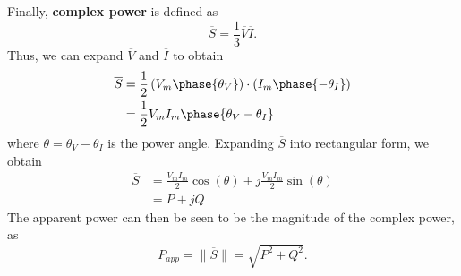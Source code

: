 \documentclass[11pt]{article}
\theoremstyle{plain} %
\theoremstyle{definition}
\theoremstyle{example}
\theoremstyle{remark}
\begin{document}
Finally, \textbf{complex power} is defined as 
$$\overline S = \frac{1}{3}\overline V\overline I.$$
Thus, we can expand $\overline V$ and $\overline I$ to obtain 
\begin{align*}
	\overline S &= \frac{1}{2}\left(V_m\phase{\theta_V}\right)\cdot \left(I_m\phase{-\theta_I}\right)\\
	&= \frac{1}{2}V_mI_m\phase{\theta_V-\theta_I}
\end{align*}
where $\theta = \theta_V-\theta_I$ is the power angle. Expanding $\overline S$ into rectangular form, we obtain 
\begin{align*}
	\overline S &= \frac{V_mI_m}{2}\cos(\theta) + j\frac{V_mI_m}{2}\sin(\theta)\\
	&= P + jQ
\end{align*}
The apparent power can then be seen to be the magnitude of the complex power, as 
$$P_{app} = \|\overline S\| = \sqrt{P^2+Q^2}.$$
\end{document}
